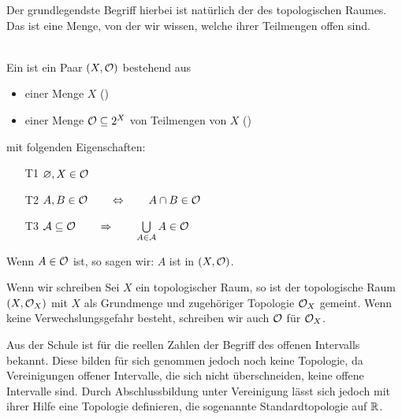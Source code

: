     Der
    grundlegendste Begriff hierbei ist natürlich der des topologischen Raumes.
    Das ist eine Menge, von der wir wissen, welche ihrer Teilmengen offen sind.
    \begin{dfn}\label{def:top} \ \\
        Ein  ist ein Paar $(X,\mathcal{O})$ bestehend aus
        \begin{itemize}
            \item einer Menge $X$ () 
            \item einer Menge $\mathcal{O} \subseteq 2^X$ von Teilmengen von $X$ ()
        \end{itemize}
        mit folgenden Eigenschaften:
        \begin{enumerate}
            \item[T1] $\varnothing, X \in \mathcal{O}$ %
            \item[T2] $A,B \in \mathcal{O} \quad \quad \Leftrightarrow \quad \quad A \cap B \in \mathcal{O}$ %
            \item[T3] $\mathcal{A} \subseteq \mathcal{O} \quad \quad \Rightarrow \quad \quad \bigcup\limits_{A \in \mathcal{A}} A \in \mathcal{O}$ %
        \end{enumerate}
        Wenn $A \in \mathcal{O}$ ist, so sagen wir: $A$ ist  in $(X, \mathcal{O})$.
    \end{dfn}
    
    \begin{konv}\label{konv:top}
        Wenn wir schreiben \glqq Sei $X$ ein topologischer Raum\grqq , so ist der topologische Raum $(X, \mathcal{O}_X)$ mit $X$ als Grundmenge und zugehöriger Topologie $\mathcal{O}_X$ gemeint. Wenn keine Verwechslungsgefahr besteht, schreiben wir auch $\mathcal{O}$ für $\mathcal{O}_X$.
    \end{konv}
    
    Aus
    der Schule ist für die reellen Zahlen der Begriff des offenen Intervalls bekannt. Diese bilden für sich genommen jedoch noch keine Topologie, da Vereinigungen offener Intervalle, die sich nicht überschneiden, keine offene Intervalle sind.
    Durch Abschlussbildung unter Vereinigung lässt sich jedoch mit ihrer Hilfe eine Topologie definieren, die sogenannte Standardtopologie auf $\mathbb{R}$.
    

